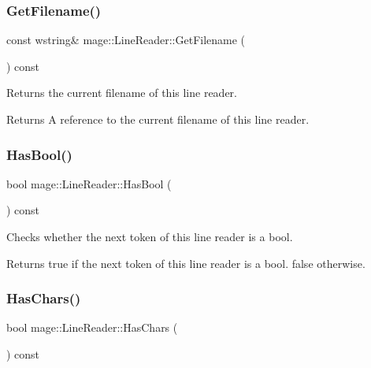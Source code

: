 \subsubsection{\texorpdfstring{Get\+Filename()}{GetFilename()}}
{\footnotesize\ttfamily const wstring\& mage\+::\+Line\+Reader\+::\+Get\+Filename (\begin{DoxyParamCaption}{ }\end{DoxyParamCaption}) const}

Returns the current filename of this line reader.

\begin{DoxyReturn}{Returns}
A reference to the current filename of this line reader. 
\end{DoxyReturn}
\hypertarget{classmage_1_1_line_reader_ac18069cc6bc399ce6ad8ad069a073c6c}{}\label{classmage_1_1_line_reader_ac18069cc6bc399ce6ad8ad069a073c6c} 
\subsubsection{\texorpdfstring{Has\+Bool()}{HasBool()}}
{\footnotesize\ttfamily bool mage\+::\+Line\+Reader\+::\+Has\+Bool (\begin{DoxyParamCaption}{ }\end{DoxyParamCaption}) const\hspace{0.3cm}{\ttfamily [protected]}}

Checks whether the next token of this line reader is a {\ttfamily bool}.

\begin{DoxyReturn}{Returns}
{\ttfamily true} if the next token of this line reader is a {\ttfamily bool}. {\ttfamily false} otherwise. 
\end{DoxyReturn}
\hypertarget{classmage_1_1_line_reader_a7eb54d60902d1fb7846ea5c566312a0f}{}\label{classmage_1_1_line_reader_a7eb54d60902d1fb7846ea5c566312a0f} 
\subsubsection{\texorpdfstring{Has\+Chars()}{HasChars()}}
{\footnotesize\ttfamily bool mage\+::\+Line\+Reader\+::\+Has\+Chars (\begin{DoxyParamCaption}{ }\end{DoxyParamCaption}) const\hspace{0.3cm}{\ttfamily [protected]}}

